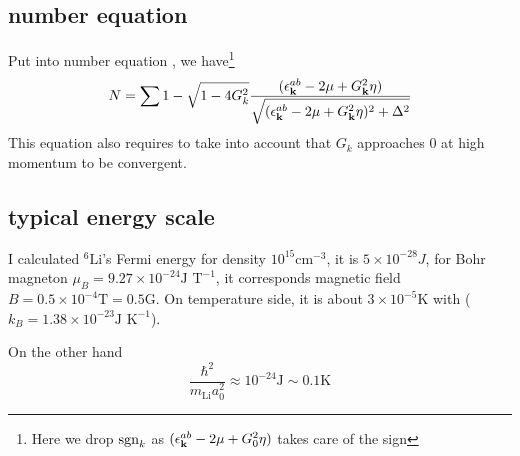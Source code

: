 \subsection{number equation}
Put  into number equation , we have\footnote{Here we drop $\text{sgn}_{k}$ as $(\epsilon^{ab}_{\mathbf{k}}-2\mu+  G_{0}^2\eta)$ takes care of the sign}
\begin{equation}\label{eq:20101011:number}
N=\sum{1-\sqrt{1-4G_{k}^{2}}\frac{(\epsilon^{ab}_{\ensuremath{\mathbf{k}}}-2\mu+  G_{\ensuremath{\mathbf{k}}}^2\eta)}{{\sqrt{{(\epsilon^{ab}_{\ensuremath{\mathbf{k}}}-2\mu+  G_{\ensuremath{\mathbf{k}}}^2\eta)^{2}+\Delta^{2}}}}}}
\end{equation}
This equation also requires to take into account that $G_{k}$ approaches 0 at high momentum to be convergent.  
\subsection{typical energy scale}
I calculated $^{6}\text{Li}$'s Fermi energy for density $10^{15}\text{cm}^{-3}$, it is $5\times10^{-28}J$, for Bohr magneton $\mu_{B}=9.27\times10^{-24}\text{J T}^{-1}$, it corresponds magnetic field $B=0.5\times10^{-4}\text{T}=0.5\text{G}$. On temperature side, it is about $3\times10^{-5}\text{K}$ with ($k_B=1.38\times 10^{-23}\text{J K}^{-1}$). 

On the other hand
\[
 \frac{\hbar^2}{m_{\text{Li}}a_0^2}\approx10^{-24}\text{J}\sim0.1\text{K}
\]


